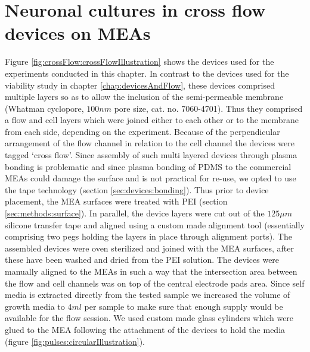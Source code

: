 \section{Neuronal cultures in cross flow devices on MEAs}
Figure \ref{fig:crossFlow:crossFlowIllustration} shows the devices used for the experiments conducted in this chapter. In contrast to the devices used for the viability study in chapter \ref{chap:devicesAndFlow}, these devices comprised multiple layers so as to allow the inclusion of the semi-permeable membrane (Whatman cyclopore, \(100 nm\) pore size, cat. no. 7060-4701). Thus they comprised a flow and cell layers which were joined either to each other or to the membrane from each side, depending on the experiment. Because of the perpendicular arrangement of the flow channel in relation to the cell channel the devices were tagged `cross flow'. Since assembly of such multi layered devices through plasma bonding is problematic and since plasma bonding of PDMS to the commercial MEAs could damage the surface and is not practical for re-use, we opted to use the tape technology (section \ref{sec:devices:bonding}). Thus prior to device placement, the MEA surfaces were treated with PEI (section \ref{sec:methods:surface}). In parallel, the device layers were cut out of the \(125 \mu m\) silicone transfer tape and aligned using a custom made alignment tool (essentially comprising two pegs holding the layers in place through alignment ports). The assembled devices were oven sterilized and joined with the MEA surfaces, after these have been washed and dried from the PEI solution. The devices were manually aligned to the MEAs in such a way that the intersection area between the flow and cell channels was on top of the central electrode pads area. Since self media is extracted directly from the tested sample we increased the volume of growth media to \(4 ml\) per sample to make sure that enough supply would be available for the flow session. We used custom made glass cylinders which were glued to the MEA following the attachment of the devices to hold the media (figure \ref{fig:pulses:circularIllustration}).


